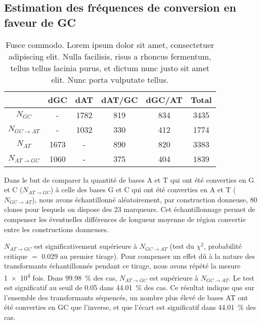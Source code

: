 \subsection{Estimation des fréquences de conversion en faveur de GC}
\label{subsec:result-freq}

\begin{table}[h!]
  \centering
  \rmfamily
  \caption[Vivamus id enim.]{Fusce commodo. Lorem ipsum dolor sit amet, consectetuer adipiscing
    elit. Nulla facilisis, risus a rhoncus fermentum, tellus tellus lacinia
    purus, et dictum nunc justo sit amet elit. Nunc porta vulputate tellus. }
  \label{tab:comptages}

  \begin{tabular}{ccccc|c}
    \toprule
                            & dGC  & dAT  & dAT/GC & dGC/AT & \textbf{Total} \\
    \midrule
    $N_{GC}$                & -    & 1782 & 819    & 834    & 3435           \\
    $N_{GC \rightarrow AT}$ & -    & 1032 & 330    & 412    & 1774           \\
    $N_{AT}$                & 1673 & -    & 890    & 820    & 3383           \\
    $N_{AT \rightarrow GC}$ & 1060 & -    & 375    & 404    & 1839           \\
    \bottomrule
  \end{tabular}
\end{table}

Dans le but de comparer la quantité de bases A et T qui ont été converties en G
et C ($N_{AT \rightarrow GC}$) à celle des bases G et C qui ont été converties
en A et T ($N_{GC \rightarrow AT}$), nous avons échantillonné aléatoirement,
par construction donneuse, 80 clones pour lesquels on dispose des 23 marqueurs.
Cet échantillonnage permet de compenser les éventuelles différences de longueur
moyenne de région convertie entre les constructions donneuses.

$N_{AT \rightarrow GC}$ est significativement supérieure à $N_{GC \rightarrow
  AT}$ (test du $\chi^2$, probabilité critique \(=\) \num{0.029} au premier
tirage). Pour compenser un effet dû à la nature des transformants échantillonnés
pendant ce tirage, nous avons répété la mesure \num{1e4} fois. Dans
\SI{99.98}{\percent} des cas, $N_{AT \rightarrow GC}$ est supérieure à $N_{GC
  \rightarrow AT}$. Le test est significatif au seuil de \num{0.05} dans
\SI{44.01}{\percent} des cas. Ce résultat indique que sur l'ensemble des
transformants séquencés, un nombre plus élevé de bases AT ont été converties en
GC que l'inverse, et que l'écart est significatif dans \SI{44.01}{\percent} des
cas.
\newpage
